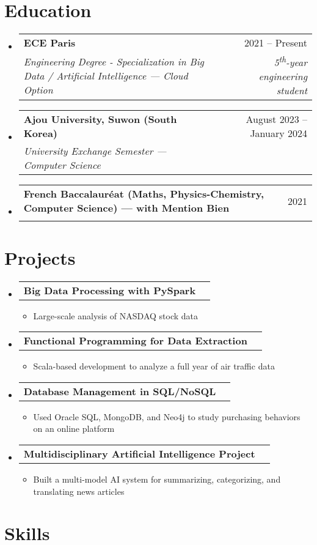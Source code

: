 \documentclass[letterpaper,10pt]{article}
\makeatletter
\newcommand{\resumeItem}[1]{
  \item\small{
    {#1 \vspace{-2pt}}
  }
}
\newcommand{\resumeSubheading}[4]{
  \vspace{-2pt}\item
    \begin{tabular*}{0.97\textwidth}[t]{l@{\extracolsep{\fill}}r}
      \textbf{#1} & #2 \\
      \textit{\small#3} & \textit{\small #4} \\
    \end{tabular*}\vspace{-7pt}
}
\newcommand{\resumeProjectHeading}[2]{
    \item
    \begin{tabular*}{0.97\textwidth}{l@{\extracolsep{\fill}}r}
      \small#1 & #2 \\
    \end{tabular*}\vspace{-7pt}
}
\newcommand{\resumeSubHeadingListStart}{\begin{itemize}[leftmargin=0.15in, label={}]}
\newcommand{\resumeSubHeadingListEnd}{\end{itemize}}
\newcommand{\resumeItemListStart}{\begin{itemize}}
\newcommand{\resumeItemListEnd}{\end{itemize}\vspace{-5pt}}
\makeatother
\begin{document}
\section{Education}
\resumeSubHeadingListStart

  \resumeSubheading
    {ECE Paris}{2021 -- Present}
    {Engineering Degree - Specialization in Big Data / Artificial Intelligence — Cloud Option}{5\textsuperscript{th}-year engineering student}

  \resumeSubheading
    {Ajou University, Suwon (South Korea)}{August 2023 -- January 2024}
    {University Exchange Semester — Computer Science}{}

  \resumeSubheading
    {French Baccalauréat (Maths, Physics-Chemistry, Computer Science) — with Mention Bien}{2021}{}{}
  \vspace{-12pt}

\resumeSubHeadingListEnd


\section{Projects}
  \resumeSubHeadingListStart

    \resumeProjectHeading
      {\textbf{Big Data Processing with PySpark}}{}
      \resumeItemListStart
        \resumeItem{Large-scale analysis of NASDAQ stock data}
      \resumeItemListEnd

    \resumeProjectHeading
      {\textbf{Functional Programming for Data Extraction}}{}
      \resumeItemListStart
        \resumeItem{Scala-based development to analyze a full year of air traffic data}
      \resumeItemListEnd

    \resumeProjectHeading
      {\textbf{Database Management in SQL/NoSQL}}{}
      \resumeItemListStart
        \resumeItem{Used Oracle SQL, MongoDB, and Neo4j to study purchasing behaviors on an online platform}
      \resumeItemListEnd

    \resumeProjectHeading
      {\textbf{Multidisciplinary Artificial Intelligence Project}}{}
      \resumeItemListStart
        \resumeItem{Built a multi-model AI system for summarizing, categorizing, and translating news articles}
      \resumeItemListEnd

  \resumeSubHeadingListEnd


\section{Skills}
\end{document}
